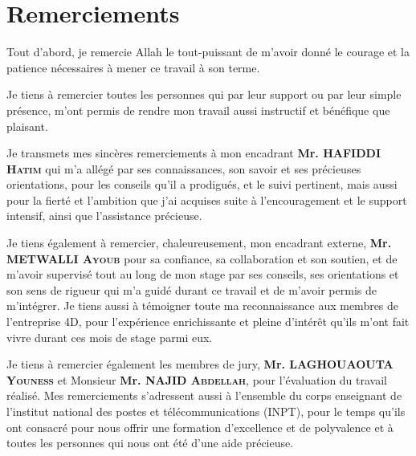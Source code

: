 \chapter*{Remerciements}


Tout d’abord, je remercie Allah le tout-puissant de m’avoir donné le courage et la patience nécessaires à mener ce travail à son terme.

\vspace{10pt}
Je tiens à remercier toutes les personnes qui par leur support ou par leur simple présence, m'ont permis de rendre mon travail aussi instructif et bénéfique que plaisant.

\vspace{10pt}
Je transmets mes sincères remerciements à mon encadrant \textbf{Mr. HAFIDDI \textsc{Hatim}} qui m'a allégé par ses connaissances, son savoir et ses précieuses orientations, pour les conseils qu’il a prodigués, et le suivi pertinent, mais aussi pour la fierté et l’ambition que j'ai acquises suite à l’encouragement et le support intensif, ainsi que l’assistance précieuse.

\vspace{10pt}
Je tiens également à remercier, chaleureusement, mon encadrant externe, \textbf{Mr. METWALLI \textsc{Ayoub}} pour sa confiance, sa collaboration et son soutien, et de m’avoir supervisé tout au long de mon stage par ses conseils, ses orientations et son sens de rigueur qui m’a guidé durant ce travail et de m’avoir permis de m’intégrer. Je tiens aussi à témoigner toute ma reconnaissance aux membres de l’entreprise 4D, pour l’expérience enrichissante et pleine d’intérêt qu’ils m’ont fait vivre durant ces mois de stage parmi eux.

\vspace{10pt}
Je tiens à remercier également les membres de jury, \textbf{Mr. LAGHOUAOUTA \textsc{Youness}} et Monsieur \textbf{Mr. NAJID \textsc{Abdellah}}, pour l’évaluation du travail réalisé. Mes remerciements s’adressent aussi à l’ensemble du corps enseignant de l’institut national des postes et télécommunications (INPT), pour le temps qu’ils ont consacré pour nous offrir une formation d’excellence et de polyvalence et à toutes les personnes qui nous ont été d’une aide précieuse.
